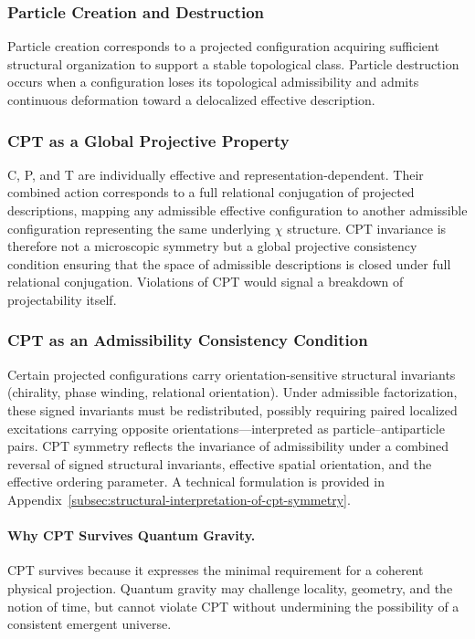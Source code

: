   \subsubsection*{Particle Creation and Destruction}
    \label{subsec:particle-creation-and-destruction}

    Particle creation corresponds to a projected configuration acquiring
    sufficient structural organization to support a stable topological class.
    Particle destruction occurs when a configuration loses its topological
    admissibility and admits continuous deformation toward a delocalized
    effective description.

  \subsubsection*{CPT as a Global Projective Property}
    \label{subsec:cpt-as-global-projective-property}

    C, P, and T are individually effective and representation-dependent.
    Their combined action corresponds to a full relational conjugation of
    projected descriptions, mapping any admissible effective configuration to
    another admissible configuration representing the same underlying
    $\chi$ structure.
    CPT invariance is therefore not a microscopic symmetry but a global
    projective consistency condition ensuring that the space of admissible
    descriptions is closed under full relational conjugation.
    Violations of CPT would signal a breakdown of projectability itself.

  \subsubsection*{CPT as an Admissibility Consistency Condition}
    \label{subsec:antiparticles-cpt}

    Certain projected configurations carry orientation-sensitive structural
    invariants (chirality, phase winding, relational orientation).
    Under admissible factorization, these signed invariants must be
    redistributed, possibly requiring paired localized excitations carrying
    opposite orientations---interpreted as particle--antiparticle pairs.
    CPT symmetry reflects the invariance of admissibility under a combined
    reversal of signed structural invariants, effective spatial orientation,
    and the effective ordering parameter.
    A technical formulation is provided in
    Appendix~\ref{subsec:structural-interpretation-of-cpt-symmetry}.

    \paragraph{Why CPT Survives Quantum Gravity.}
      \label{subsec:why-cpt-survives-quantum-gravity}
      CPT survives because it expresses the minimal requirement for a coherent
      physical projection.
      Quantum gravity may challenge locality, geometry, and the notion of time,
      but cannot violate CPT without undermining the possibility of a
      consistent emergent universe.
